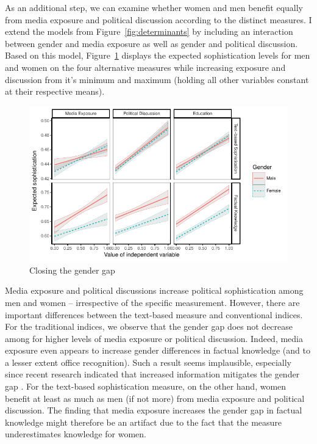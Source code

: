\documentclass[12pt]{article}
\begin{document}
As an additional step, we can examine whether women and men benefit equally from media exposure and political discussion according to the distinct measures. I extend the models from Figure~\ref{fig:determinants} by including an interaction between gender and media exposure as well as gender and political discussion. Based on this model, Figure~\ref{fig:closing} displays the expected sophistication levels for men and women on the four alternative measures while increasing exposure and discussion from it's minimum and maximum (holding all other variables constant at their respective means).

\begin{figure}[h]\centering
\includegraphics{../fig/closing.pdf}
\caption{Closing the gender gap}\label{fig:closing}
\end{figure}

Media exposure and political discussions increase political sophistication among men and women -- irrespective of the specific measurement. However, there are important differences between the text-based measure and conventional indices. For the traditional indices, we observe that the gender gap does not decrease among for higher levels of media exposure or political discussion. Indeed, media exposure even appears to increase gender differences in factual knowledge (and to a lesser extent office recognition). Such a result seems implausible, especially since recent research indicated that increased information mitigates the gender gap \citep{jerit2017revisiting}. For the text-based sophistication measure, on the other hand, women benefit at least as much as men (if not more) from media exposure and political discussion. The finding that media exposure increases the gender gap in factual knowledge might therefore be an artifact due to the fact that the measure underestimates knowledge for women.
\end{document}
